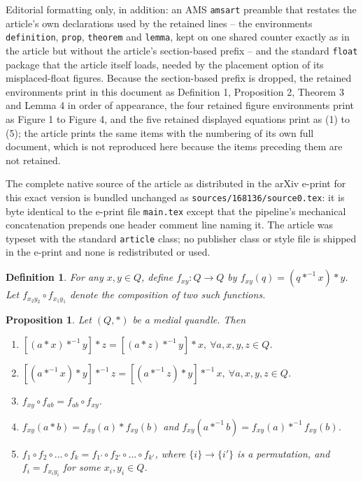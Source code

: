 \documentclass[10pt,a4paper]{amsart}
\newtheorem{prop}[theorem]{Proposition}
\newtheorem{definition}[theorem]{Definition}
\begin{document}
Editorial formatting only, in addition: an AMS \texttt{amsart} preamble that restates the article's own declarations used by the retained lines -- the environments \texttt{definition}, \texttt{prop}, \texttt{theorem} and \texttt{lemma}, kept on one shared counter exactly as in the article but without the article's section-based prefix -- and the standard \texttt{float} package that the article itself loads, needed by the placement option of its misplaced-float figures. Because the section-based prefix is dropped, the retained environments print in this document as Definition 1, Proposition 2, Theorem 3 and Lemma 4 in order of appearance, the four retained figure environments print as Figure 1 to Figure 4, and the five retained displayed equations print as (1) to (5); the article prints the same items with the numbering of its own full document, which is not reproduced here because the items preceding them are not retained.

The complete native source of the article as distributed in the arXiv e-print for this exact version is bundled unchanged as \texttt{sources/168136/source0.tex}: it is byte identical to the e-print file \texttt{main.tex} except that the pipeline's mechanical concatenation prepends one header comment line naming it. The article was typeset with the standard \texttt{article} class; no publisher class or style file is shipped in the e-print and none is redistributed or used.
\begin{definition} \label{Dfxy} For any $x,y\in Q$, define $f_{xy}:Q\to Q$ by $f_{xy}(q)=(q*^{-1}x)*y$. Let $f_{x_2y_2}\circ f_{x_1y_1}$ denote the composition of two such functions. \end{definition} 

\begin{prop} \label{propertyfxy}\mbox{} 
Let $(Q,*)$ be a medial quandle. Then

\begin{enumerate}
    \item \label{a1} $[(a*x)*^{-1}y]*z=[(a*z)*^{-1}y]*x,~\forall a,x,y,z\in Q$.\\
\item \label{a2} $[(a*^{-1}x)*y]*^{-1}z=[(a*^{-1}z)*y]*^{-1}x,~\forall a,x,y,z\in Q$.\\ 
\item  \label{a3} $f_{xy}\circ f_{ab}=f_{ab}\circ f_{xy}$. 
    \item \label{a4} $f_{xy}(a*b)=f_{xy}(a)*f_{xy}(b)$ and $f_{xy}(a*^{-1}b)=f_{xy}(a)*^{-1}f_{xy}(b)$. 
    \item  \label{a5}$f_1\circ f_2\circ...\circ f_k=f_{1'}\circ f_{2'}\circ...\circ f_{k'}$, where $\{i\}\to\{i'\}$ is a permutation, and $f_i=f_{x_iy_i}$ for some $x_i,y_i\in Q$.

\end{enumerate} \end{prop}
\end{document}
